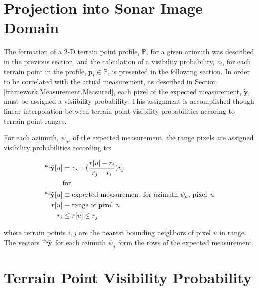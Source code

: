 \section{Projection into Sonar Image Domain}
\label{visibility.Projection}

The formation of a 2-D terrain point profile, $\mathbb{P}$, for a given azimuth was described in the previous section, and the calculation of a visibility probability, $v_i$, for each terrain point in the profile, $\mathbf{p}_i \in \mathbb{P}$, is presented in the following section.
In order to be correlated with the actual measurement, as described in Section \ref{framework.Measurement.Measured}, each pixel of the expected measurement, $\tilde{\mathbf{y}}$, must be assigned a visiibility probability.
This assignment is accomplished though linear interpolation between terrain point visibility probabilities accoring to terrain point ranges.

For each azimuth, $\psi_a$, of the expected measurement, the range pixels are assigned visibility probabilities according to:

\begin{align}
\begin{split}
^{\psi_a} \hspace{-0.4ex} \tilde{\mathbf{y}}[u] &= v_i + (\frac{r[u] - r_i}{r_j - r_i})v_j \\
&\text{for} \\
^{\psi_a} \hspace{-0.4ex} \tilde{\mathbf{y}}[u] &\equiv \text{expected measurement for azimuth $\psi_a$, pixel} \hspace{1ex} u \\
r[u] &\equiv \text{range of pixel} \hspace{1ex} u \\
r_i &\leq r[u] \leq r_j \\
\end{split}
\label{eq:linearInterp}
\end{align}

\noindent where terrain points $i,j$ are the nearest bounding neighbors of pixel $u$ in range.
The vectors $^{\psi_a} \hspace{-0.4ex} \tilde{\mathbf{y}}$ for each azimuth $\psi_a$ form the rows of the expected measurement.

\section{Terrain Point Visibility Probability}
\label{visibility.Visibility}

